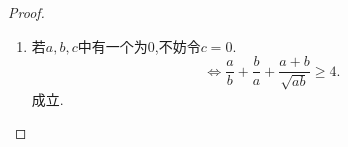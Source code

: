 \documentclass[]{article}
\begin{document}
{\begin{proof}
\begin{enumerate}
\begin{equation}
\begin{split}
       \end{split}
       \end{equation}
       \begin{equation}\nonumber
       \begin{split}
           -12abc(\sum\limits_{sym}a^2b)^2+16a^2b^2c^2(\sum a^3)+63a^2b^2c^2(\sum\limits_{sym}a^2b)\\+16abc(\sum a^3)(\sum\limits_{sym}a^2b)+96a^3b^3c^3\geq 0
       \end{split}
       \end{equation}
       \begin{equation}\nonumber
       \begin{split}
           \Longleftrightarrow 12abc(\sum\limits_{sym}a^2b)(\sum a^3-\sum\limits_{sym}a^2b+3abc)\\+16a^2b^2c^2(\sum a^3)+27a^2b^2c^2(\sum\limits_{sym}a^2b)\\+4abc(\sum a^3)(\sum\limits_{sym}a^2b)+96a^3b^3c^3\geq 0
       \end{split}
       \end{equation}
       而
       \begin{equation}\nonumber
           \begin{split}
               16a^2b^2c^2(\sum a^3)+27a^2b^2c^2(\sum\limits_{sym}a^2b)\\+4abc(\sum a^3)(\sum\limits_{sym}a^2b)+96a^3b^3c^3\geq 0
           \end{split}
       \end{equation}
       成立.
    \item 若$a,b,c$中有一个为$0$,不妨令$c=0$.
        \begin{equation}\nonumber
            \Longleftrightarrow \frac{a}{b}+\frac{b}{a}+\frac{a+b}{\sqrt{ab}}\geq 4.
        \end{equation}
        成立.
\end{enumerate}
\end{proof}
}
\end{document}
